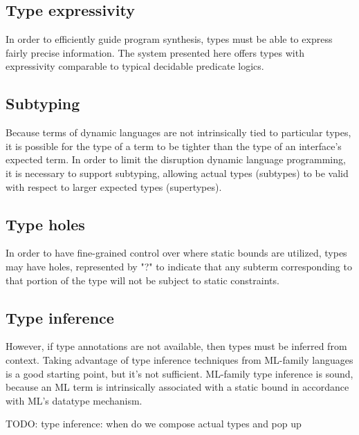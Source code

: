 \documentclass[]{acmart}
\begin{document}
\subsection*{Type expressivity}
In order to efficiently guide program synthesis, types must be able to express 
fairly precise information. 
The system presented here offers types with 
expressivity comparable to typical decidable predicate logics. 

\subsection*{Subtyping}
Because terms of dynamic languages are not intrinsically tied to particular types,
it is possible for the type of a term to be tighter than the type 
of an interface's expected term. In order to limit the disruption dynamic language programming,
it is necessary to support subtyping, allowing actual types (subtypes) 
to be valid with respect to larger expected types (supertypes). 


\subsection*{Type holes}
In order to have fine-grained control over where static bounds are utilized, 
types may have holes, represented by "?" to indicate that any subterm corresponding to that
portion of the type will not be subject to static constraints.

\subsection*{Type inference}
However, if type annotations are not available, then types must be inferred from context. 
Taking advantage of type inference techniques from ML-family languages is a good starting point,
but it's not sufficient. ML-family type inference is sound, because an ML term is 
intrinsically associated with a static bound in accordance with ML's datatype mechanism.

TODO: type inference: when do we compose actual types and pop up
\end{document}

